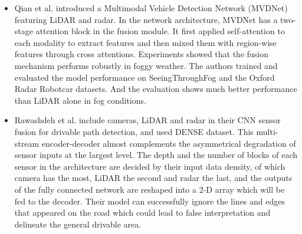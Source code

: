 \documentclass[rnd]{mas_proposal}
\begin{document}
\begin{itemize}
      \item Qian et al. \cite{qian2021robust} introduced a Multimodal Vehicle Detection Network (MVDNet) featuring LiDAR and radar. In the network architecture, MVDNet has a two-stage attention block in the fusion module. It first applied self-attention to each modality to extract features and then mixed them with region-wise features through cross attentions. Experiments showed that the fusion mechanism performs robustly in foggy weather. The authors trained and evaluated the model performance on SeeingThroughFog \cite{bijelic2020seeing} and the Oxford Radar Robotcar \cite{barnes2020oxford} datasets. And the evaluation shows much better performance than LiDAR alone in fog conditions.
      
      \item Rawashdeh et al. \cite{rawashdeh2021drivable} include cameras, LiDAR and radar in their CNN sensor fusion for drivable path detection, and used DENSE \cite{bijelic2020seeing} dataset. This multi-stream encoder-decoder almost complements the asymmetrical degradation of sensor inputs at the largest level. The depth and the number of blocks of each sensor in the architecture are decided by their input data density, of which camera has the most, LiDAR the second and radar the last, and the outputs of the fully connected network are reshaped into a 2-D array which will be fed to the decoder. Their model can successfully ignore the lines and edges that appeared on the road which could lead to false interpretation and delineate the general drivable area.


\end{itemize}
\end{document}
